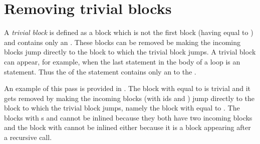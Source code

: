 \section{Removing trivial blocks}

A \textit{trivial block} is defined as a block which is not the first block (having  equal to ) and
contains only an . These blocks can be removed be making the incoming blocks jump
directly to the block to which the trivial block jumps. A trivial block can appear, for example, when the last statement
in the body of a loop is an  statement. Thus the  of the  statement contains only an
 to the .

An example of this pass is provided in . The block with  equal to
 is trivial and it gets removed by making the incoming blocks (with ids  and ) jump directly to
the block to which the trivial block jumps, namely the block with  equal to . The blocks with
s  and  cannot be inlined because they both have two incoming blocks and the block with
  cannot be inlined either because it is a block appearing after a recursive call.

